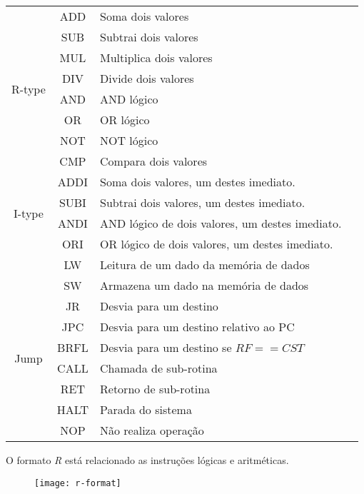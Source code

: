 \begin{center}
\begin{longtable}[pos]{| c | c | l | m{7cm} |}
			\multirow{8}{*}{R-type} & ADD & Soma dois valores \\ \cline{2-3}	
	& SUB & Subtrai dois valores \\ \cline{2-3}	
	& MUL & Multiplica dois valores \\ \cline{2-3}	
	& DIV & Divide dois valores \\ \cline{2-3}
	& AND & AND lógico \\ \cline{2-3}
	& OR & OR lógico  \\ \cline{2-3}
	& NOT & NOT lógico \\ \cline{2-3}
	& CMP & Compara dois valores \\ \hline 
	\multirow{4}{*}{I-type} & ADDI & Soma dois valores, um destes imediato. \\ \cline{2-3}
	& SUBI & Subtrai dois valores, um destes imediato. \\ \cline{2-3}
	& ANDI & AND lógico de dois valores, um destes imediato. \\ \cline{2-3}
	& ORI & OR lógico de dois valores, um destes imediato. \\ \cline{2-3}
	& LW & Leitura de um dado da memória de dados \\ \cline{2-3}
	& SW & Armazena um dado na memória de dados \\ \hline
	\multirow{6}{*}{Jump} & JR & Desvia para um destino \\ \cline{2-3}
	& JPC & Desvia para um destino relativo ao PC \\ \cline{2-3}
	& BRFL & Desvia para um destino se $RF==CST$ \\ \cline{2-3}
	& CALL & Chamada de sub-rotina \\ \cline{2-3}
	& RET & Retorno de sub-rotina \\ \cline{2-3}
	& HALT & Parada do sistema \\ \cline{2-3}
	& NOP & Não realiza operação \\ \hline
\end{longtable}
\end{center}

	O formato \textit{R} está relacionado as instruções lógicas e aritméticas.
	\begin{figure}[H]
    	\centering
    	\texttt{[image: r-format]}
	\end{figure}
	
